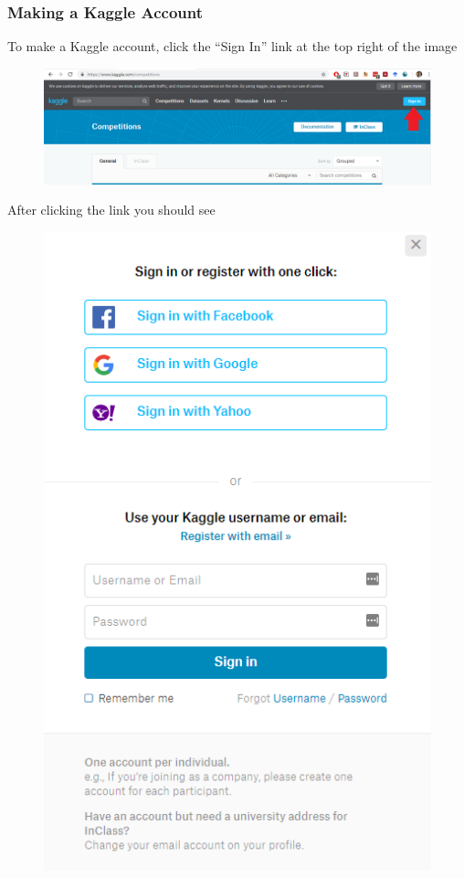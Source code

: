 \documentclass{article}
\begin{document}
\subsubsection{Making a Kaggle Account}\label{making-a-kaggle-account}

To make a Kaggle account, click the ``Sign In'' link at the top right of the image

\begin{figure}[H]
    \centering
    \includegraphics[width=\linewidth]{figures/sign-in.PNG}
\end{figure}

After clicking the link you should see

\begin{figure}[H]
    \centering
    \includegraphics[width=\linewidth]{figures/sign-in-click.PNG}
\end{figure}
\end{document}
